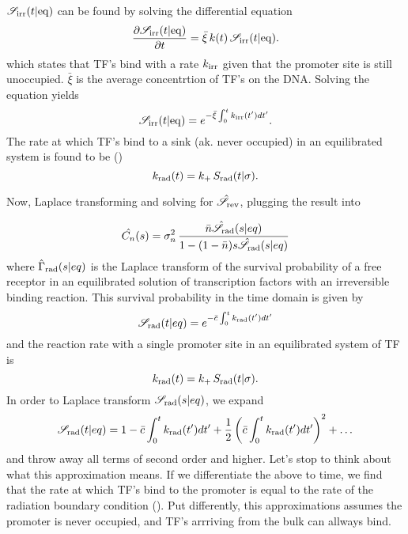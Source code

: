 $\mathscr{S}_{\rm irr}(t|{\rm eq})$ can be found by solving the differential equation
\begin{equation}
 \frac{\partial \mathscr{S}_{\rm irr}(t|{\rm eq})}{\partial t} = \bar{\xi} \, k(t) \, \mathscr{S}_{\rm irr}(t|{\rm eq}).
\end{equation}
which states that TF's bind with a rate $k_{{\rm irr}}$ given that the promoter site is still unoccupied. $\bar{\xi}$ is the average concentrtion of TF's on the DNA. Solving the equation yields
\begin{equation}
 \mathscr{S}_{\rm irr}(t|{\rm eq}) = e^{-\bar{\xi}\int_0^t k_{{\rm irr}}(t') dt'}.
\end{equation}
The rate at which TF's bind to a sink (ak. never occupied) in an equilibrated system is found to be ()
\begin{equation}
 k_{\rm rad}(t) = k_+ \, S_{\rm rad}(t|\sigma).
 \elabel{krad}
\end{equation}

Now, Laplace transforming  and solving for $\hat{\mathscr{S}}_{{\rm rev}}$, plugging the result into 


\begin{equation}
 \hat{C_n}(s) = \sigma_n^2 \, \frac{\bar{n} \hat{\mathscr{S}}_{\rm rad}(s|eq)}{1-(1-\bar{n})s\hat{\mathscr{S}}_{\rm rad}(s|eq)}
 \elabel{LapCorr}
\end{equation}
where $\hat{\Gamma}_{\rm rad}(s|eq)$ is the Laplace transform of the survival probability of a free receptor in an equilibrated solution of transcription factors with an irreversible binding reaction. This survival probability in the time domain is given by \cite{Agmon1990}
\begin{equation}
 \mathscr{S}_{\rm rad}(t|eq) = e^{-\bar{c} \int_0^t k_{\rm rad}(t')dt'}
 \elabel{Seq}
\end{equation}
and the reaction rate with a single promoter site in an equilibrated system of TF is
\begin{equation}
 k_{\rm rad}(t) = k_+ \, S_{\rm rad}(t|\sigma).
\end{equation}
In order to Laplace transform $\mathscr{S}_{\rm rad}(s|eq)$, we expand 
\begin{equation}
 \mathscr{S}_{\rm rad}(t|eq) = 1 - \bar{c} \int_0^t k_{\rm rad}(t')dt' + \frac{1}{2} \left( \bar{c} \int_0^t k_{\rm rad}(t')dt' \right)^2 + \ldots
 \elabel{ApproxLowC}
\end{equation}
and throw away all terms of second order and higher. Let's stop to think about what this approximation means. If we differentiate the above to time, we find that the rate at which TF's bind to the promoter is equal to the rate of the radiation boundary condition (). Put differently, this approximations assumes the promoter is never occupied, and TF's arrriving from the bulk can allways bind. 

